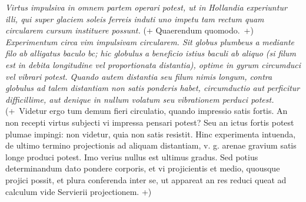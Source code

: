  \textit{Virtus impulsiva in  omnem partem operari potest, ut in }\textit{Hollandia}\protect{}\textit{ experiuntur  illi, qui super glaciem soleis ferreis induti uno impetu  tam rectum quam circularem cursum instituere  possunt.} (+ Quaerendum quomodo.~+) \textit{Experimentum circa }\textit{vim impulsivam}\protect{}\textit{ circularem. Sit  globus plumbeus }\textit{a}\textit{ mediante filo }\textit{ab}\textit{ alligatus  baculo }\textit{bc}\textit{; hic globulus }\textit{a}\textit{ beneficio istius baculi ab aliquo (si  filum est in debita longitudine vel proportionata distantia), optime in gyrum circumduci vel vibrari potest. Quando autem distantia seu filum nimis longum, contra globulus ad talem distantiam non satis ponderis  habet, circumductio aut perficitur difficillime, aut  denique in nullum volatum seu vibrationem perduci potest.} (+~Videtur ergo tum demum fieri circulatio,  quando impressio satis fortis. An non recepti virtus  subjecti vi impressa\protect{} pensari potest? Seu an ictus  fortis potest plumae impingi: non videtur,  quia non satis resistit. Hinc experimenta  intuenda, de ultimo termino projectionis ad aliquam distantiam, v. g. arenae gravium satis longe produci potest. Imo verius nullus est  ultimus gradus. Sed potius determinandum dato pondere corporis, et vi projicientis et  medio, quousque projici possit, et plura conferenda  inter se, ut appareat an res reduci queat ad  calculum vide Servierii\protect{} projectionem. +)
\pend 
\pstart 
